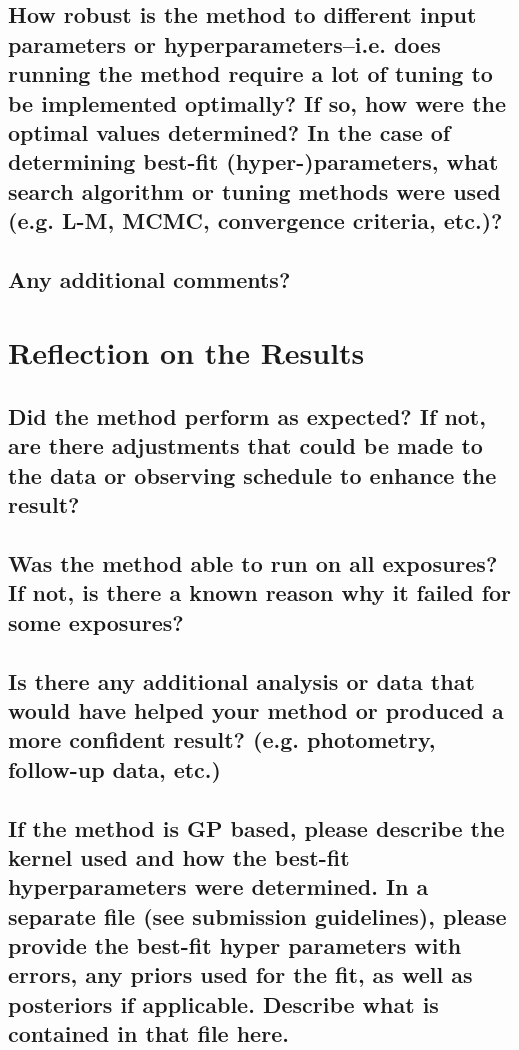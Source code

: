 \documentclass[12pt]{article}
\numberwithin{equation}{section}
\begin{document}
\subsection{How robust is the method to different input parameters or hyperparameters--i.e. does running the method require a lot of tuning to be implemented optimally?  If so, how were the optimal values determined? In the case of determining best-fit (hyper-)parameters, what search algorithm or tuning methods were used (e.g. L-M, MCMC, convergence criteria, etc.)?}

\subsection{Any additional comments?}


\section{Reflection on the Results}
\subsection{Did the method perform as expected?  If not, are there adjustments that could be made to the data or observing schedule to enhance the result?}

\subsection{Was the method able to run on all exposures?  If not, is there a known reason why it failed for some exposures?}

\subsection{Is there any additional analysis or data that would have helped your method or produced a more confident result?  (e.g. photometry, follow-up data, etc.)}

\subsection{If the method is GP based, please describe the kernel used and how the best-fit hyperparameters were determined.   In a separate file (see submission guidelines), please provide the best-fit hyper parameters with errors, any priors used for the fit, as well as posteriors if applicable.  Describe what is contained in that file here.}
\end{document}

